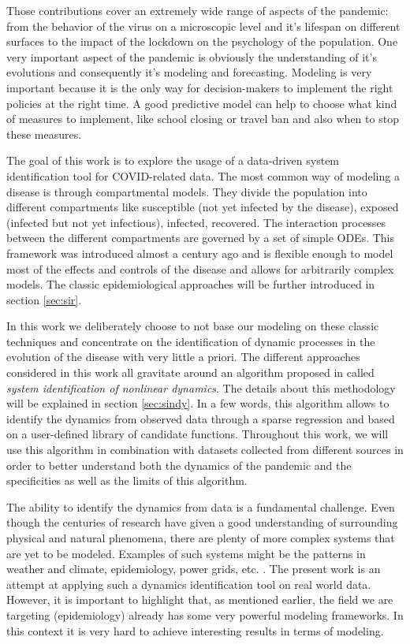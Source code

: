 \documentclass[12pt, letterpaper]{article}
\begin{document}
Those contributions cover an extremely wide range of aspects of the pandemic: from the behavior of the virus on a microscopic level and it's lifespan on different surfaces to the impact of the lockdown on the psychology of the population. 
One very important aspect of the pandemic is obviously the understanding of it's evolutions and consequently it's modeling and forecasting. 
Modeling is very important because it is the only way for decision-makers to implement the right policies at the right time. 
A good predictive model can help to choose what kind of measures to implement, like school closing or travel ban and also when to stop these measures.

The goal of this work is to explore the usage of a data-driven system identification tool for COVID-related data. 
The most common way of modeling a disease is through compartmental models. 
They divide the population into different compartments like susceptible (not yet infected by the disease), exposed (infected but not yet infectious), infected, recovered. 
The interaction processes between the different compartments are governed by a set of simple ODEs. 
This framework was introduced almost a century ago and is flexible enough to model most of the effects and controls of the disease and allows for arbitrarily complex models. 
The classic epidemiological approaches will be further introduced in section \ref{sec:sir}.

In this work we deliberately choose to not base our modeling on these classic techniques and concentrate on the identification of dynamic processes in the evolution of the disease with very little a priori.
The different approaches considered in this work all gravitate around an algorithm proposed in \cite{sindy} called {\em system identification of nonlinear dynamics}. 
The details about this methodology will be explained in section \ref{sec:sindy}. 
In a few words, this algorithm allows to identify the dynamics from observed data through a sparse regression and based on a user-defined library of candidate functions. 
Throughout this work, we will use this algorithm in combination with datasets collected from different sources in order to better understand both the dynamics of the pandemic and the specificities as well as the limits of this algorithm. 

The ability to identify the dynamics from data is a fundamental challenge. 
Even though the centuries of research have given a good understanding of surrounding physical and natural phenomena, there are plenty of more complex systems that are yet to be modeled. 
Examples of such systems might be the patterns in weather and climate, epidemiology, power grids, etc. \cite{sindy}. 
The present work is an attempt at applying such a dynamics identification tool on real world data. 
However, it is important to highlight that, as mentioned earlier, the field we are targeting (epidemiology) already has some very powerful modeling frameworks. 
In this context it is very hard to achieve interesting results in terms of modeling.
\end{document}
